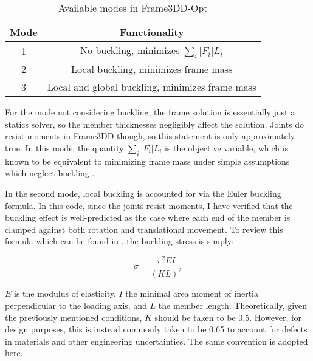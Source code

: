 \documentclass{report}
\begin{document}
\begin{table}
  \caption{Available modes in Frame3DD-Opt}
  \centering
  \begin{tabular}{c|c}
    Mode & Functionality \\
    \hline
    1 & No buckling, minimizes $\sum_i |F_i| L_i$ \\
    2 & Local buckling, minimizes frame mass \\
    3 & Local and global buckling, minimizes frame mass \\
  \end{tabular}
\end{table}

For the mode not considering buckling, the frame solution is essentially just a statics solver, so the member
thicknesses negligibly affect the solution. Joints do resist moments in Frame3DD though, so this statement is
only approximately true. In this mode, the quantity $\sum_i |F_i| L_i$ is the objective variable, which
is known to be equivalent to minimizing frame mass under simple assumptions which neglect buckling \cite{muellerComputationalExplorationStructural2014}.

In the second mode, local buckling is accounted for via the Euler buckling formula. In this code, since the
joints resist moments, I have verified that the buckling effect is well-predicted as the case where each end
of the member is clamped against both rotation and translational movement. To review this formula which can
be found in \cite{gereMechanicsMaterials1996}, the buckling stress is simply:

\begin{equation}
  \sigma = \frac{\pi^2 E I}{(K L)^2}
\end{equation}

$E$ is the modulus of elasticity, $I$ the minimal area moment of inertia perpendicular to the loading axis,
and $L$ the member length.
Theoretically, given the previously mentioned conditions, $K$ should be taken to be 0.5. However, for design
purposes, this is instead commonly taken to be 0.65 to account for defects in materials and other engineering
uncertainties. The same convention is adopted here.
\end{document}
